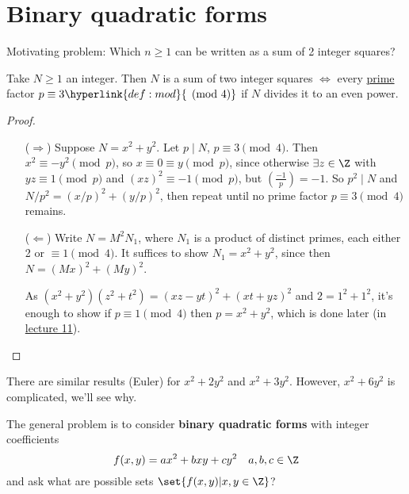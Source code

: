 \documentclass{article}
\newcommand{\legendre}[2]{\genfrac{(}{)}{}{}{#1}{#2}}
\begin{document}

\clearpage

\section{Binary quadratic forms}
Motivating problem: Which $n \geq 1$ can be written as a sum of 2 integer squares?

\begin{nthm}\label{thm:4.1}
    Take $N \geq 1$ an integer.
    Then $N$ is a sum of two integer squares $\iff$ every \hyperlink{def:prime}{prime} factor $p \equiv 3 \hyperlink{def:mod}{\pmod{4}}$ if $N$ divides it to an even power.
\end{nthm}

\begin{proof}
    \begin{itemize}
        \item [($\Rightarrow$)] Suppose $N = x^2 + y^2$. Let $p \mid N$, $p \equiv 3 \pmod{4}$.
            Then $x^2 \equiv -y^2 \pmod{p}$, so $x \equiv 0 \equiv y \pmod{p}$, since otherwise $\exists z \in \Z$ with $y z \equiv 1 \pmod{p}$ and $(xz)^2 \equiv -1 \pmod{p}$, but $\legendre{-1}{p} = -1$.
            So $p^2 \mid N$ and $N/p^2 = (x / p)^2 + (y / p)^2$, then repeat until no prime factor $p \equiv 3 \pmod{4}$ remains.

        \item [($\Leftarrow$)] Write $N = M^2 N_1$, where $N_1$ is a product of distinct primes, each either 2 or $\equiv1 \pmod{4}$.
            It suffices to show $N_1 = x^2 + y^2$, since then $N = (Mx)^2 + (My)^2$.

            As $(x^2 + y^2)(z^2 + t^2) = (xz - yt)^2 + (xt + yz)^2$ and $2 = 1^2 + 1^2$, it's enough to show if $p \equiv 1 \pmod{4}$ then $p = x^2 + y^2$, which is done later (in \hyperlink{prf:twoSquare}{lecture 11}). \qedhere %
    \end{itemize}
\end{proof}

There are similar results (Euler) for $x^2 + 2y^2$ and $x^2 + 3y^2$.  However, $x^2 + 6y^2$ is complicated, we'll see why.

The general problem is to consider \textbf{binary quadratic forms} with integer coefficients
\begin{equation*}
    f(x, y) = a x^2 + b x y + c y^2 \quad a,b,c \in \Z
\end{equation*}
and ask what are possible sets $\set{f(x, y) | x, y \in \Z}$?
\end{document}

